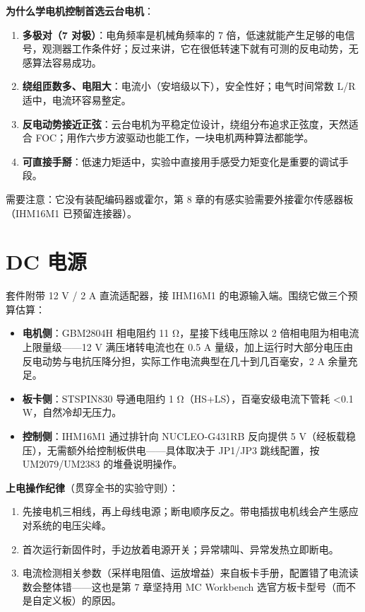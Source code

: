 \documentclass[
  UTF8,
  scheme=plain,
  fontsize=10pt,
  openany
]{ctexbook}
\begin{document}
\textbf{为什么学电机控制首选云台电机}：

\begin{enumerate}
\def\labelenumi{\arabic{enumi}.}
\tightlist
\item
  \textbf{多极对（7 对极）}：电角频率是机械角频率的 7
  倍，低速就能产生足够的电信号，观测器工作条件好；反过来讲，它在很低转速下就有可测的反电动势，无感算法容易成功。
\item
  \textbf{绕组匝数多、电阻大}：电流小（安培级以下），安全性好；电气时间常数
  L/R 适中，电流环容易整定。
\item
  \textbf{反电动势接近正弦}：云台电机为平稳定位设计，绕组分布追求正弦度，天然适合
  FOC；用作六步方波驱动也能工作，一块电机两种算法都能学。
\item
  \textbf{可直接手掰}：低速力矩适中，实验中直接用手感受力矩变化是重要的调试手段。
\end{enumerate}

需要注意：它没有装配编码器或霍尔，第 8
章的有感实验需要外接霍尔传感器板（IHM16M1 已预留连接器）。

\section{DC 电源}\label{dc-ux7535ux6e90}

套件附带 12 V / 2 A 直流适配器，接 IHM16M1
的电源输入端。围绕它做三个预算估算：

\begin{itemize}
\tightlist
\item
  \textbf{电机侧}：GBM2804H 相电阻约 11 Ω，星接下线电压除以 2
  倍相电阻为相电流上限量级------12 V 满压堵转电流也在 0.5 A
  量级，加上运行时大部分电压由反电动势与电抗压降分担，实际工作电流典型在几十到几百毫安，2
  A 余量充足。
\item
  \textbf{板卡侧}：STSPIN830 导通电阻约 1 Ω（HS+LS），百毫安级电流下管耗
  \textless0.1 W，自然冷却无压力。
\item
  \textbf{控制侧}：IHM16M1 通过排针向 NUCLEO-G431RB 反向提供 5
  V（经板载稳压），无需额外给控制板供电------具体取决于 JP1/JP3
  跳线配置，按 UM2079/UM2383 的堆叠说明操作。
\end{itemize}

\textbf{上电操作纪律}（贯穿全书的实验守则）：

\begin{enumerate}
\def\labelenumi{\arabic{enumi}.}
\tightlist
\item
  先接电机三相线，再上母线电源；断电顺序反之。带电插拔电机线会产生感应对系统的电压尖峰。
\item
  首次运行新固件时，手边放着电源开关；异常啸叫、异常发热立即断电。
\item
  电流检测相关参数（采样电阻值、运放增益）来自板卡手册，配置错了电流读数会整体错------这也是第
  7 章坚持用 MC Workbench 选官方板卡型号（而不是自定义板）的原因。
\end{enumerate}
\end{document}
